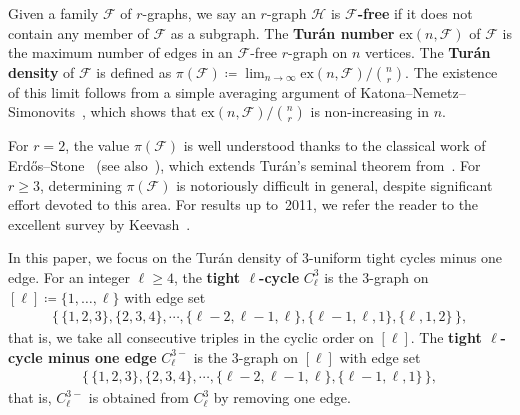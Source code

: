 \documentclass[11pt,a4paper]{article}
\theoremstyle{remark}
\begin{document}
Given a family $\mathcal{F}$ of $r$-graphs, we say an $r$-graph $\mathcal{H}$ is \textbf{$\mathcal{F}$-free}
if it does not contain any member of $\mathcal{F}$ as a subgraph.
The \textbf{Tur\'{a}n number} $\mathrm{ex}(n, \mathcal{F})$ of $\mathcal{F}$ is the maximum number of edges in an $\mathcal{F}$-free $r$-graph on $n$ vertices. 
The \textbf{Tur\'{a}n density} of $\mathcal{F}$ is defined as $\pi(\mathcal{F})\coloneq \lim_{n\to\infty}\mathrm{ex}(n,\mathcal{F})/{n\choose r}$. 
The existence of this limit follows from a simple averaging argument of Katona--Nemetz--Simonovits~\cite{KNS64}, which shows that $\mathrm{ex}(n,\mathcal{F})/{n\choose r}$ is non-increasing in $n$.

For $r=2$, the value $\pi(\mathcal{F})$ is well understood thanks to the classical work of Erd\H{o}s--Stone~\cite{ES46} (see also~\cite{ES66}), which extends Tur\'{a}n's seminal theorem from~\cite{Tur41}.
For $r \ge 3$, determining $\pi(\mathcal{F})$ is notoriously difficult in general, despite significant effort devoted to this area. 
For results up to~2011, we refer the reader to the excellent survey by Keevash~\cite{Kee11}.

In this paper, we focus on the Tur\'{a}n density of $3$-uniform tight cycles minus one edge. 
For an integer $\ell \ge 4$, the \textbf{tight $\ell$-cycle} $C_{\ell}^{3}$ is the $3$-graph on $[\ell]\coloneqq \{1,\dots,\ell\}$ with edge set 
\begin{align*}
    \big\{\,\{1,2,3\}, \{2,3,4\}, \cdots, \{\ell-2,\ell-1,\ell\},\{\ell-1,\ell,1\},\{\ell,1,2\}\,\big\},
\end{align*}
 that is, we take all consecutive triples in the cyclic order on $[\ell]$.
The \textbf{tight $\ell$-cycle minus one edge} $C_{\ell}^{3-}$ is the $3$-graph on $[\ell]$ with edge set 
\begin{align*}
    \big\{\,\{1,2,3\}, \{2,3,4\}, \cdots, \{\ell-2,\ell-1,\ell\},\{\ell-1,\ell,1\}\,\big\}, 
\end{align*}
 that is, $C_{\ell}^{3-}$ is obtained from  $C_{\ell}^{3}$ by removing one edge. 
%
%
\end{document}
